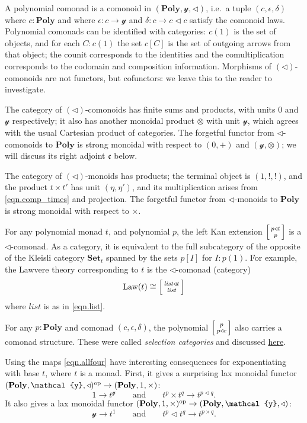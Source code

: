 \documentclass[11pt, one side, article]{memoir}
\makeatletter
\theoremstyle{definition}
\theoremstyle{plain}
\newcommand{\Cat}[1]{\mathbf{#1}}%
\newcommand{\Fun}[1]{\mathit{#1}}%
\newcommand{\op}{^\tn{op}}
\newcommand{\tn}[1]{\textnormal{#1}}
\newcommand{\smset}{\Cat{Set}}
\newcommand{\List}{\Fun{list}}
\newcommand{\yon}{\mathcal{y}}
\newcommand{\poly}{\Cat{Poly}}
\newcommand{\0}{\textsf{0}}
\newcommand{\1}{\tn{\textsf{1}}}
\newcommand{\tri}{\mathbin{\triangleleft}}
\newcommand{\cofree}{\mathfrak{c}}
\newcommand{\uu}{\List}
\newcommand{\biglens}[2]{
     \begin{bmatrix}{\vphantom{f_f^f}#2} \\ {\vphantom{f_f^f}#1} \end{bmatrix}
}
\newcommand{\littlelens}[2]{
     \begin{bsmallmatrix}{\vphantom{f}#2} \\ {\vphantom{f}#1} \end{bsmallmatrix}
}
\newcommand{\lens}[2]{
  \relax\if@display
     \biglens{#1}{#2}
  \else
     \littlelens{#1}{#2}
  \fi
}
\newcommand{\qqand}{\qquad\text{and}\qquad}
\makeatother
\begin{document}
A polynomial comonad is a comonoid in $(\poly,\yon,\tri)$, i.e.\ a tuple $(c,\epsilon,\delta)$ where $c:\poly$ and where $\epsilon\colon c\to\yon$ and $\delta\colon c\to c\tri c$ satisfy the comonoid laws. Polynomial comonads can be identified with categories: $c(1)$ is the set of objects, and for each $C:c(1)$ the set $c[C]$ is the set of outgoing arrows from that object; the counit corresponds to the identities and the comultiplication corresponds to the codomain and composition information. Morphisms of $(\tri)$-comonoids are not functors, but cofunctors: we leave this to the reader to investigate.

The category of $(\tri)$-comonoids has finite sums and products, with units $0$ and $\yon$ respectively; it also has another monoidal product $\otimes$ with unit $\yon$, which agrees with the usual Cartesian product of categories. The forgetful functor from $\tri$-comonoids to $\poly$ is strong monoidal with respect to $(0,+)$ and $(\yon,\otimes)$; we will discuss its right adjoint $\cofree$ below.

The category of $(\tri)$-monoids has products; the terminal object is $(1,!,!)$, and the product $t\times t'$ has unit $(\eta,\eta')$, and its multiplication arises from \eqref{eqn.comp_times} and projection. The forgetful functor from $\tri$-monoids to $\poly$ is strong monoidal with respect to $\times$. 

For any polynomial monad $t$, and polynomial $p$, the left Kan extension $\lens{p}{p\tri t}$ is a $\tri$-comonad. As a category, it is equivalent to the full subcategory of the opposite of the Kleisli category $\smset_t$ spanned by the sets $p[I]$ for $I:p(1)$. For example, the Lawvere theory corresponding to $t$ is the $\tri$-comonad (category)
\begin{equation}
	\text{Law}(t)\cong\lens{\uu}{\uu\tri t}
\end{equation}
where $\uu$ is as in \eqref{eqn.list}.

For any $p:\poly$ and comonad $(c,\epsilon,\delta)$, the polynomial $\lens{p\tri c}{p}$ also carries a comonad structure. These were called \emph{selection categories} and discussed \href{https://topos.site/blog/2021/12/creating-new-categories-from-old-selection-categories/}{here}.

Using the maps \eqref{eqn.allfour} have interesting consequences for exponentiating with base $t$, where $t$ is a monad. First, it gives a surprising lax monoidal functor $(\poly,\yon,\tri)\op\to(\poly,1,\times)$:
\begin{equation}\label{eqn.monad_times}
	1\to t^\yon
	\qqand
	t^p\times t^q\to t^{p\tri q}.
\end{equation}
It also gives a lax monoidal functor $(\poly,1,\times)\op\to(\poly,\yon,\tri)$:
\begin{equation}\label{eqn.monad_tri}
	\yon\to t^1
	\qqand
	t^p\tri t^q\to t^{p\times q}.
\end{equation}
\end{document}
